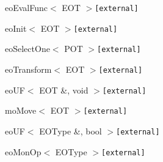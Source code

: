 \begin{CompactList}
\begin{CompactList}
\begin{CompactList}
\item eo\-Eval\-Func$<$ EOT $>${\tt  \mbox{[}external\mbox{]}}\begin{CompactList}
\item {}
\item {}
\item {}
\end{CompactList}
\item eo\-Init$<$ EOT $>${\tt  \mbox{[}external\mbox{]}}\begin{CompactList}
\item {}
\end{CompactList}
\item eo\-Select\-One$<$ POT $>${\tt  \mbox{[}external\mbox{]}}\begin{CompactList}
\item {}
\end{CompactList}
\item eo\-Transform$<$ EOT $>${\tt  \mbox{[}external\mbox{]}}\begin{CompactList}
\item {}
\end{CompactList}
\end{CompactList}
\item eo\-UF$<$ EOT \&, void $>${\tt  \mbox{[}external\mbox{]}}\begin{CompactList}
\item mo\-Move$<$ EOT $>${\tt  \mbox{[}external\mbox{]}}\begin{CompactList}
\item {}
\end{CompactList}
\end{CompactList}
\item eo\-UF$<$ EOType \&, bool $>${\tt  \mbox{[}external\mbox{]}}\begin{CompactList}
\item eo\-Mon\-Op$<$ EOType $>${\tt  \mbox{[}external\mbox{]}}\begin{CompactList}
\item {}

\end{CompactList}
\end{CompactList}
\end{CompactList}
\end{CompactList}
